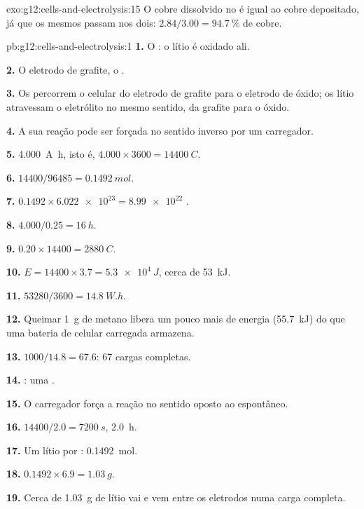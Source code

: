 \begin{solution}{exo:g12:cells-and-electrolysis:15}
O cobre dissolvido no  é igual ao cobre depositado, já que os
mesmos  passam nos dois: $2.84/3.00 = \qty{94.7}{\percent}$ de
cobre.
\end{solution}

\begin{solution}{pb:g12:cells-and-electrolysis:1}
\textbf{1.} O : o lítio é oxidado ali.

\textbf{2.} O eletrodo de grafite, o .

\textbf{3.} Os  percorrem o celular do eletrodo de grafite para
o eletrodo de óxido; os  lítio atravessam o eletrólito no mesmo
sentido, da grafite para o óxido.

\textbf{4.} A sua reação pode ser forçada no sentido inverso por um
carregador.

\textbf{5.} \qty{4.000}{A.h}, isto é, $4.000 \times 3600 =
\qty{14400}{C}$.

\textbf{6.} $14400/96485 = \qty{0.1492}{mol}$.

\textbf{7.} $0.1492 \times \num{6.022e23} = \num{8.99e22}$ .

\textbf{8.} $4.000/0.25 = \qty{16}{h}$.

\textbf{9.} $0.20 \times 14400 = \qty{2880}{C}$.

\textbf{10.} $E = 14400 \times 3.7 = \qty{5.3e4}{J}$, cerca de
\qty{53}{kJ}.

\textbf{11.} $53280/3600 = \qty{14.8}{W.h}$.

\textbf{12.} Queimar \qty{1}{g} de metano libera um pouco mais de
energia (\qty{55.7}{kJ}) do que uma bateria de celular carregada
armazena.

\textbf{13.} $1000/14.8 = 67.6$: 67 cargas completas.

\textbf{14.} : uma .

\textbf{15.} O carregador força a reação no sentido oposto ao
espontâneo.

\textbf{16.} $14400/2.0 = \qty{7200}{s}$, \qty{2.0}{h}.

\textbf{17.} Um  lítio por : \qty{0.1492}{mol}.

\textbf{18.} $0.1492 \times 6.9 = \qty{1.03}{g}$.

\textbf{19.} Cerca de \qty{1.03}{g} de lítio vai e vem entre os
eletrodos numa carga completa.
\end{solution}
